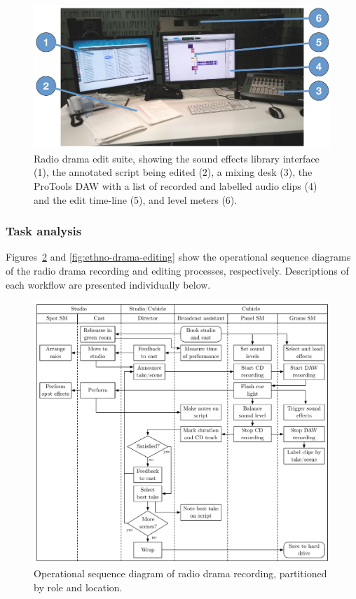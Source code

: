 \begin{figure}
  \centering
  \includegraphics[width=\columnwidth]{figs/drama-edit-labelled.pdf}
  \caption{Radio drama edit suite, showing the sound effects library interface (1), the annotated script being edited
  (2), a mixing desk (3), the ProTools DAW with a list of recorded and labelled audio clips (4) and the edit time-line
  (5), and level meters (6).}
  \label{fig:drama-edit}
\end{figure}

\subsubsection{Task analysis}
Figures~\ref{fig:ethno-drama-recording} and \ref{fig:ethno-drama-editing} show the operational sequence diagrams of the
radio drama recording and editing processes, respectively. Descriptions of each workflow are presented individually
below.

\begin{figure}
  \centering
  \includegraphics[width=5in]{figs/drama-recording-workflow.pdf}
  \caption{Operational sequence diagram of radio drama recording, partitioned by role and location.}
  \label{fig:ethno-drama-recording}
\end{figure}

